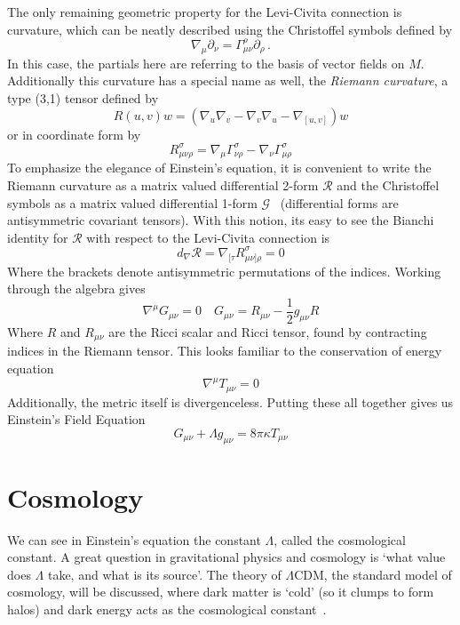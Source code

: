 The only remaining geometric property for the Levi-Civita connection is curvature, which can be neatly described using the Christoffel symbols defined by
\begin{equation}
    \nabla_\mu\partial_\nu = \Gamma^{\rho}_{\mu\nu}\partial_\rho\,.
\end{equation}
In this case, the partials here are referring to the basis of vector fields on $M$. Additionally this curvature has a special name as well, the \textit{Riemann curvature}, a type (3,1) tensor defined by
\begin{equation}
    R(u,v)w = (\nabla_u\nabla_v-\nabla_v\nabla_u - \nabla_{[u,v]})w
\end{equation}
or in coordinate form by
\begin{equation}
    R_{\mu\nu\rho}^\sigma  = \nabla_\mu \Gamma^\sigma_{\nu\rho} - \nabla_\nu\Gamma^{\sigma}_{\mu\rho}
\end{equation}
To emphasize the elegance of Einstein's equation, it is convenient to write the Riemann curvature as a matrix valued differential 2-form $\mathcal{R}$ and the Christoffel symbols as a matrix valued differential 1-form $\mathcal{G}$~\cite{baez_john_gauge_1994} (differential forms are antisymmetric covariant tensors). With this notion, its easy to see the Bianchi identity for $\mathcal{R}$ with respect to the Levi-Civita connection is
\begin{equation}
    d_{\nabla}\mathcal{R} = \nabla_{[\tau}R^\sigma_{\mu\nu]\rho} = 0
\end{equation}
Where the brackets denote antisymmetric permutations of the indices. Working through the algebra gives
\begin{equation}
    \nabla^\mu G_{\mu\nu} = 0\quad G_{\mu\nu} = R_{\mu\nu}-\frac{1}{2}g_{\mu\nu}R
\end{equation}
Where $R$ and $R_{\mu\nu}$ are the Ricci scalar and Ricci tensor, found by contracting indices in the Riemann tensor. This looks familiar to the conservation of energy equation
\begin{equation}
    \nabla^\mu T_{\mu\nu}=0
\end{equation}
Additionally, the metric itself is divergenceless. Putting these all together gives us Einstein's Field Equation
\begin{equation}
    G_{\mu\nu} + \Lambda g_{\mu\nu} = 8\pi\kappa T_{\mu\nu}
\end{equation}

\section{Cosmology}
We can see in Einstein's equation the constant $\Lambda$, called the cosmological constant. A great question in gravitational physics and cosmology is `what value does $\Lambda$ take, and what is its source'. The theory of $\Lambda$CDM, the standard model of cosmology, will be discussed, where dark matter is `cold' (so it clumps to form halos) and dark energy acts as the cosmological constant~\cite{scott_dodelson_modern_2021}.

